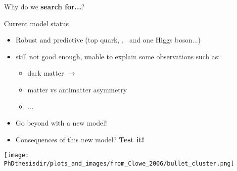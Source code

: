 \begin{frame}

\begin{center}
Why do we \textbf{search for...}?
\end{center}

\begin{minipage}[c]{.45\textwidth}
\begin{block}{Current model status}
\begin{itemize}
\item Robust and predictive (top quark, \Wboson, \Zboson\ and one Higgs boson...)
\item still not good enough, unable to explain some observations such as:
\begin{itemize}
\item dark matter $\longrightarrow$
\item matter vs antimatter asymmetry
\item ...
\end{itemize}
\item Go beyond with a new model!
\item Consequences of this new model? \textbf{\color{ltcolorred}Test it!}
\end{itemize}
\end{block}
\end{minipage}
\hfill
\begin{minipage}[c]{.45\textwidth}
\begin{center}
\texttt{[image: \\PhDthesisdir/plots\_and\_images/from\_Clowe\_2006/bullet\_cluster.png]}
\end{center}
\end{minipage}
\end{frame}

